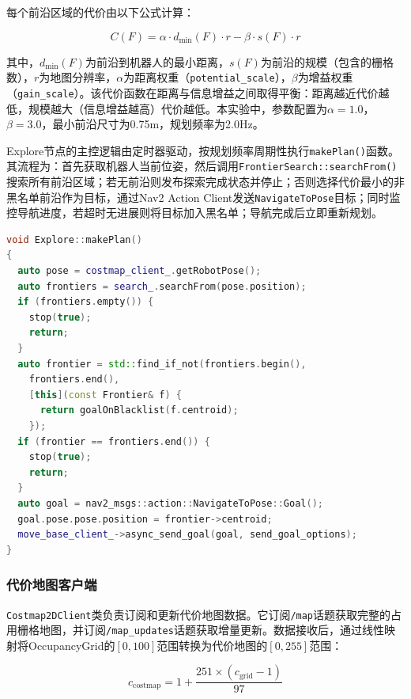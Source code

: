 \documentclass[a4paper,12pt]{article}
\begin{document}
每个前沿区域的代价由以下公式计算：

\begin{equation}
  C(F) = \alpha \cdot d_{\min}(F) \cdot r - \beta \cdot s(F) \cdot r
  \label{eq:frontier_cost}
\end{equation}

其中，$d_{\min}(F)$为前沿到机器人的最小距离，$s(F)$为前沿的规模（包含的栅格数），$r$为地图分辨率，$\alpha$为距离权重（\texttt{potential\_scale}），$\beta$为增益权重（\texttt{gain\_scale}）。该代价函数在距离与信息增益之间取得平衡：距离越近代价越低，规模越大（信息增益越高）代价越低。本实验中，参数配置为$\alpha = 1.0$，$\beta = 3.0$，最小前沿尺寸为0.75m，规划频率为2.0Hz。

Explore节点的主控逻辑由定时器驱动，按规划频率周期性执行\texttt{makePlan()}函数。其流程为：首先获取机器人当前位姿，然后调用\texttt{FrontierSearch::searchFrom()}搜索所有前沿区域；若无前沿则发布探索完成状态并停止；否则选择代价最小的非黑名单前沿作为目标，通过Nav2 Action Client发送\texttt{NavigateToPose}目标；同时监控导航进度，若超时无进展则将目标加入黑名单；导航完成后立即重新规划。

\begin{lstlisting}[language=C++,title={探索主控逻辑（explore.cpp）}]
void Explore::makePlan()
{
  auto pose = costmap_client_.getRobotPose();
  auto frontiers = search_.searchFrom(pose.position);
  if (frontiers.empty()) {
    stop(true);
    return;
  }
  auto frontier = std::find_if_not(frontiers.begin(),
    frontiers.end(),
    [this](const Frontier& f) {
      return goalOnBlacklist(f.centroid);
    });
  if (frontier == frontiers.end()) {
    stop(true);
    return;
  }
  auto goal = nav2_msgs::action::NavigateToPose::Goal();
  goal.pose.pose.position = frontier->centroid;
  move_base_client_->async_send_goal(goal, send_goal_options);
}
\end{lstlisting}

\subsubsection{代价地图客户端}

\texttt{Costmap2DClient}类负责订阅和更新代价地图数据。它订阅\texttt{/map}话题获取完整的占用栅格地图，并订阅\texttt{/map\_updates}话题获取增量更新。数据接收后，通过线性映射将OccupancyGrid的$[0, 100]$范围转换为代价地图的$[0, 255]$范围：

\begin{equation}
  c_{\text{costmap}} = 1 + \frac{251 \times (c_{\text{grid}} - 1)}{97}
  \label{eq:costmap_translation}
\end{equation}
\end{document}

